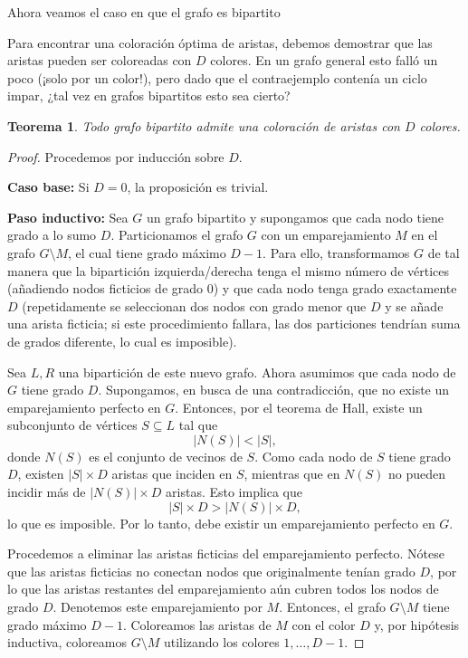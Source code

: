 \documentclass[a4paper]{article}
\newtheorem{theorem}{Teorema}
\begin{document}
Ahora veamos el caso en que el grafo es bipartito

Para encontrar una coloración óptima de aristas, debemos demostrar que las aristas pueden ser coloreadas con $D$ colores. En un grafo general esto falló un poco (¡solo por un color!), pero dado que el contraejemplo contenía un ciclo impar, ¿tal vez en grafos bipartitos esto sea cierto?

\begin{theorem}
Todo grafo bipartito admite una coloración de aristas con $D$ colores.
\end{theorem}

\begin{proof}
Procedemos por inducción sobre $D$.

\textbf{Caso base:} Si $D=0$, la proposición es trivial.

\textbf{Paso inductivo:} Sea $G$ un grafo bipartito y supongamos que cada nodo tiene grado a lo sumo $D$. Particionamos el grafo $G$ con un emparejamiento $M$ en el grafo $G\setminus M$, el cual tiene grado máximo $D-1$. Para ello, transformamos $G$ de tal manera que la bipartición izquierda/derecha tenga el mismo número de vértices (añadiendo nodos ficticios de grado $0$) y que cada nodo tenga grado exactamente $D$ (repetidamente se seleccionan dos nodos con grado menor que $D$ y se añade una arista ficticia; si este procedimiento fallara, las dos particiones tendrían suma de grados diferente, lo cual es imposible).

Sea $L,R$ una bipartición de este nuevo grafo. Ahora asumimos que cada nodo de $G$ tiene grado $D$. Supongamos, en busca de una contradicción, que no existe un emparejamiento perfecto en $G$. Entonces, por el teorema de Hall, existe un subconjunto de vértices $S\subseteq L$ tal que
\[
|N(S)| < |S|,
\]
donde $N(S)$ es el conjunto de vecinos de $S$. Como cada nodo de $S$ tiene grado $D$, existen $|S|\times D$ aristas que inciden en $S$, mientras que en $N(S)$ no pueden incidir más de $|N(S)|\times D$ aristas. Esto implica que
\[
|S|\times D > |N(S)|\times D,
\]
lo que es imposible. Por lo tanto, debe existir un emparejamiento perfecto en $G$.

Procedemos a eliminar las aristas ficticias del emparejamiento perfecto. Nótese que las aristas ficticias no conectan nodos que originalmente tenían grado $D$, por lo que las aristas restantes del emparejamiento aún cubren todos los nodos de grado $D$. Denotemos este emparejamiento por $M$. Entonces, el grafo $G\setminus M$ tiene grado máximo $D-1$. Coloreamos las aristas de $M$ con el color $D$ y, por hipótesis inductiva, coloreamos $G\setminus M$ utilizando los colores $1,\dots, D-1$.
\end{proof}
\end{document}
